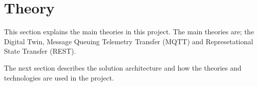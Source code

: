 \section{Theory} \label{sec:theory}
This section explains the main theories in this project. The main theories are; the Digital Twin, Message Queuing Telemetry Transfer (MQTT) and Represetational State Transfer (REST).  








The next section describes the solution architecture and how the theories and technologies are used in the project. 